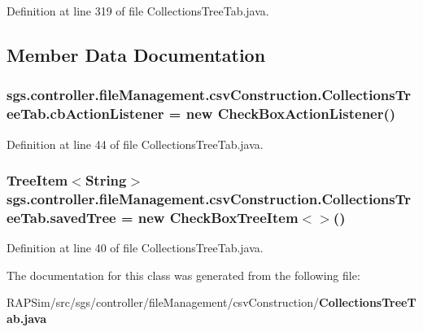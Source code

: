 Definition at line 319 of file Collections\-Tree\-Tab.\-java.



\subsection{Member Data Documentation}
\subsubsection[{cb\-Action\-Listener}]{ sgs.\-controller.\-file\-Management.\-csv\-Construction.\-Collections\-Tree\-Tab.\-cb\-Action\-Listener = new {\bf Check\-Box\-Action\-Listener}()}\label{classsgs_1_1controller_1_1file_management_1_1csv_construction_1_1_collections_tree_tab_a1382b921c1e8ef2c5a53e12b3552f2a1}


Definition at line 44 of file Collections\-Tree\-Tab.\-java.

\subsubsection[{saved\-Tree}]{\setlength{\rightskip}{0pt plus 5cm}Tree\-Item$<$String$>$ sgs.\-controller.\-file\-Management.\-csv\-Construction.\-Collections\-Tree\-Tab.\-saved\-Tree = new Check\-Box\-Tree\-Item$<$$>$()\hspace{0.3cm}{\ttfamily [static]}}\label{classsgs_1_1controller_1_1file_management_1_1csv_construction_1_1_collections_tree_tab_a3e88059f73b869a39dbc92cc35ed067a}


Definition at line 40 of file Collections\-Tree\-Tab.\-java.



The documentation for this class was generated from the following file\-:\begin{DoxyCompactItemize}
\item 
R\-A\-P\-Sim/src/sgs/controller/file\-Management/csv\-Construction/{\bf Collections\-Tree\-Tab.\-java}\end{DoxyCompactItemize}
